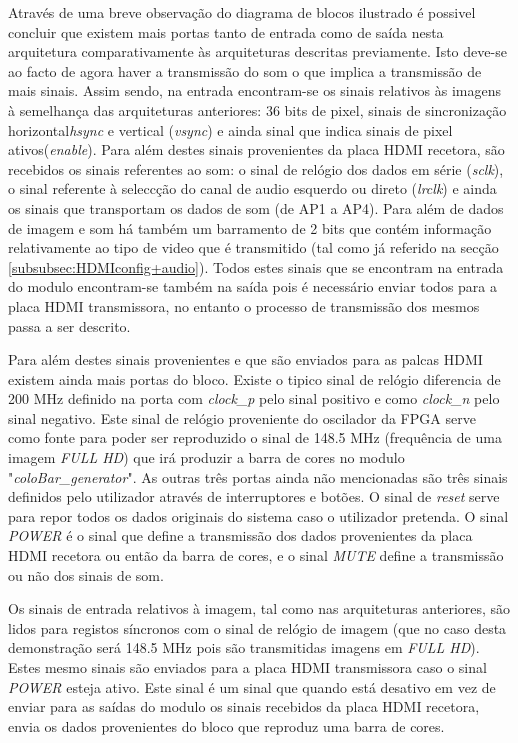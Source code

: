 Através de uma breve observação do diagrama de blocos ilustrado é possivel concluir que existem mais portas tanto de entrada como de saída nesta arquitetura comparativamente às arquiteturas descritas previamente. Isto deve-se ao facto de agora haver a transmissão do som o que implica a transmissão de mais sinais. Assim sendo, na entrada encontram-se os sinais relativos às imagens à semelhança das arquiteturas anteriores: 36 bits de pixel, sinais de sincronização horizontal\textit{hsync} e vertical (\textit{vsync}) e ainda sinal que indica sinais de pixel ativos(\textit{enable}). Para além destes sinais provenientes da placa HDMI recetora, são recebidos os sinais referentes ao som: o sinal de relógio dos dados em série (\textit{sclk}), o sinal referente à seleccção do canal de audio esquerdo ou direto (\textit{lrclk}) e ainda os sinais que transportam os dados de som (de AP1 a AP4). Para além de dados de imagem e som há também um barramento de 2 bits que contém informação relativamente ao tipo de video que é transmitido (tal como já referido na secção \ref{subsubsec:HDMIconfig+audio}). Todos estes sinais que se encontram na entrada do modulo encontram-se também na saída pois é necessário enviar todos para a placa HDMI transmissora, no entanto o processo de transmissão dos mesmos passa a ser descrito.

Para além destes sinais provenientes e que são enviados para as palcas HDMI existem ainda mais portas do bloco. Existe o tipico sinal de relógio diferencia de 200 MHz definido na porta com \textit{clock\_p} pelo sinal positivo e como \textit{clock\_n} pelo sinal negativo. Este sinal de relógio proveniente do oscilador da FPGA serve como fonte para poder ser reproduzido o sinal de 148.5 MHz (frequência de uma imagem \textit{FULL HD}) que irá produzir a barra de cores no modulo "\textit{coloBar\_generator}". As outras três portas ainda não mencionadas são três sinais definidos pelo utilizador através de interruptores e botões. O sinal de \textit{reset} serve para repor todos os dados originais do sistema caso o utilizador pretenda. O sinal \textit{POWER} é o sinal que define a transmissão dos dados provenientes da placa HDMI recetora ou então da barra de cores, e o sinal \textit{MUTE} define a transmissão ou não dos sinais de som.


Os sinais de entrada relativos à imagem, tal como nas arquiteturas anteriores, são lidos para registos síncronos com o sinal de relógio de imagem (que no caso desta demonstração será 148.5 MHz pois são transmitidas imagens em \textit{FULL HD}). Estes mesmo sinais são enviados para a placa HDMI transmissora caso o sinal \textit{POWER} esteja ativo. Este sinal é um sinal que quando está desativo em vez de enviar para as saídas do modulo os sinais recebidos da placa HDMI recetora, envia os dados provenientes do bloco que reproduz uma barra de cores.

